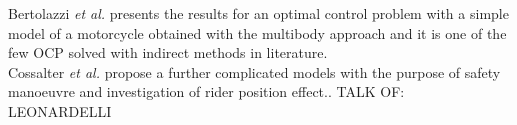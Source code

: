 Bertolazzi \textit{et al.}\cite{bertolazzi2005symbolic} presents the results for an optimal control problem with a simple model of a motorcycle obtained with the multibody approach and it is one of the few OCP solved with indirect methods in literature.\cite{biral2016notes}\\
Cossalter \textit{et al.} propose a further complicated models with the purpose of safety manoeuvre and investigation of rider position effect.\cite{cossalter2013optimization,massaro2010virtual}.
%
TALK OF:\\
LEONARDELLI \\
%